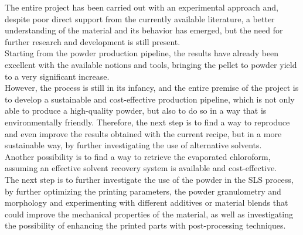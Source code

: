 \documentclass[a4paper]{article}
\begin{document}
    The entire project has been carried out with an experimental approach and, despite poor direct support 
    from the currently available literature, a better understanding of 
    the material and its behavior has emerged, but the need for further research and development is still 
    present. \\ 

    Starting from the powder production pipeline, the results have already been excellent with the available notions and tools, bringing 
    the pellet to powder yield to a very significant increase. \\ 

    However, the process is still in its infancy, and the entire premise of the project is to develop a sustainable 
    and cost-effective production pipeline, which is not only able to produce a high-quality powder, but also 
    to do so in a way that is environmentally friendly. Therefore, the next step is to find a way to reproduce and 
    even improve the results obtained with the current recipe, but in a more sustainable way, by further 
    investigating the use of alternative solvents. \\ 

    Another possibility is to find a way to retrieve the evaporated chloroform, assuming an effective solvent recovery 
    system is available and cost-effective. \\ 

    The next step is to further investigate the use of the powder in the SLS process, by further optimizing the 
    printing parameters, the powder granulometry and morphology and experimenting with different additives or material blends that 
    could improve the mechanical properties of the material, as well as investigating the possibility of enhancing the printed parts 
    with post-processing techniques. \\ 

    \nocite{Blender,PrusaSlicer,GIMP,Inkscape,Pixelmator_Pro,Labplot,Octave,DALLE2,git,latex}


    \clearpage

    \printbibheading[heading=bibliography, title=Bibliography]
    \printbibliography[type=article,heading=subbibliography,title={Articles}]
    \printbibliography[type=book,heading=subbibliography,title={Books}]

    \clearpage
    \printbibheading[heading=bibliography, title=Other references]
    \printbibliography[type=software,heading=subbibliography,title={Software used}]
\end{document}
